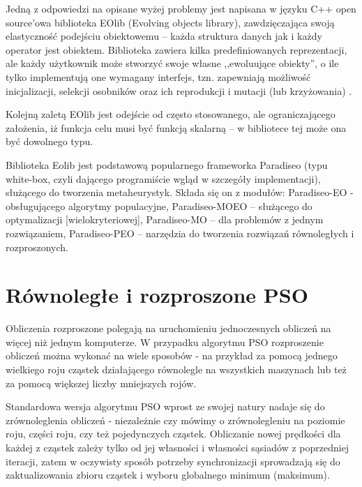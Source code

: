 \documentclass[12pt, twoside, openany, abstract=on]{report}
\theoremstyle{definition}
\begin{document}
Jedną z odpowiedzi na opisane wyżej problemy jest napisana w języku C++ open source’owa biblioteka EOlib (Evolving objects library), zawdzięczająca swoją elastyczność podejściu obiektowemu – każda struktura danych jak i każdy operator jest obiektem. Biblioteka zawiera kilka predefiniowanych reprezentacji, ale każdy użytkownik może stworzyć swoje własne ,,ewoluujące obiekty'', o ile tylko implementują one wymagany interfejs, tzn. zapewniają możliwość inicjalizacji, selekcji osobników oraz ich reprodukcji i mutacji (lub krzyżowania) 
. 

Kolejną zaletą EOlib jest odejście od często stosowanego, ale ograniczającego założenia, iż funkcja celu musi być funkcją skalarną – w bibliotece tej może ona być dowolnego typu.

Biblioteka Eolib jest podstawową popularnego frameworka Paradiseo (typu white-box, czyli dającego programiście wgląd w szczegóły implementacji), służącego do tworzenia metaheurystyk.
Składa się on z modułów: Paradiseo-EO -  obsługującego algorytmy populacyjne, Paradiseo-MOEO – służącego do optymalizacji [wielokryteriowej], Paradiseo-MO – dla problemów z jednym rozwiązaniem, Paradiseo-PEO – narzędzia do tworzenia rozwiązań równoległych i rozproszonych.


\section{Równoległe i rozproszone PSO}

Obliczenia rozproszone polegają na uruchomieniu jednoczesnych obliczeń na więcej niż jednym komputerze. W przypadku algorytmu PSO rozproszenie obliczeń można wykonać na wiele sposobów - na przykład za pomocą jednego wielkiego roju cząstek działającego równolegle na wszystkich maszynach lub też za pomocą większej liczby mniejszych rojów.  



Standardowa wersja algorytmu PSO wprost ze swojej natury nadaje się do zrównoleglenia obliczeń - niezależnie czy mówimy o zrównolegleniu na poziomie roju, części roju, czy też pojedynczych cząstek.
Obliczanie nowej prędkości dla każdej z cząstek zależy tylko od jej własności i własności sąsiadów z poprzedniej iteracji, zatem w oczywisty sposób potrzeby synchronizacji sprowadzają się do zaktualizowania zbioru cząstek 
 i wyboru globalnego minimum (maksimum). 
\end{document}
